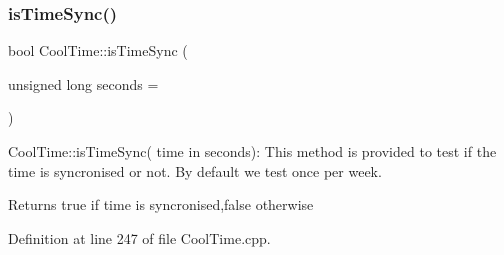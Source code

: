 \mbox{\label{class_cool_time_a5ae038a4498602b189f76a10bf02adf8}} 
\subsubsection{\texorpdfstring{is\+Time\+Sync()}{isTimeSync()}}
{\footnotesize\ttfamily bool Cool\+Time\+::is\+Time\+Sync (\begin{DoxyParamCaption}\item[{unsigned long}]{seconds = {} }\end{DoxyParamCaption})}

Cool\+Time\+::is\+Time\+Sync( time in seconds)\+: This method is provided to test if the time is syncronised or not. By default we test once per week.

\begin{DoxyReturn}{Returns}
true if time is syncronised,false otherwise 
\end{DoxyReturn}


Definition at line 247 of file Cool\+Time.\+cpp.


